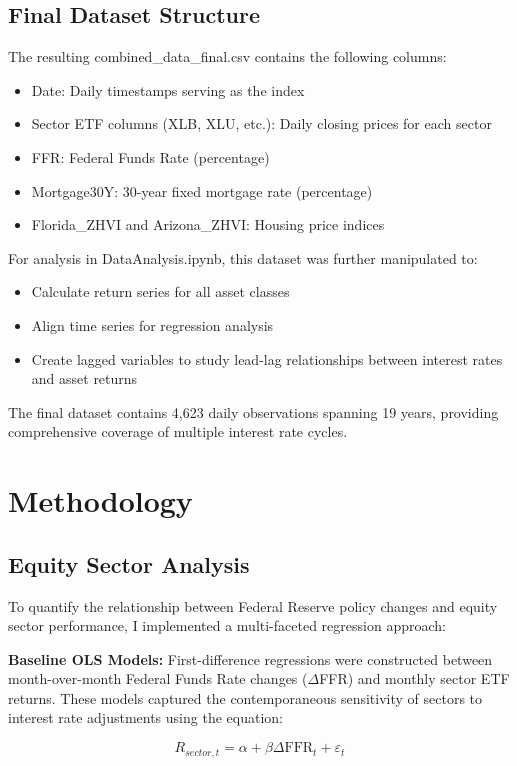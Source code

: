 \documentclass[12pt, stu, abstract]{apa7}
\begin{document}
\subsection{Final Dataset Structure}
The resulting combined\_data\_final.csv contains the following columns:

\begin{itemize}
\item Date: Daily timestamps serving as the index
\item Sector ETF columns (XLB, XLU, etc.): Daily closing prices for each sector
\item FFR: Federal Funds Rate (percentage)
\item Mortgage30Y: 30-year fixed mortgage rate (percentage)
\item Florida\_ZHVI and Arizona\_ZHVI: Housing price indices
\end{itemize}

For analysis in DataAnalysis.ipynb, this dataset was further manipulated to:
\begin{itemize}
\item Calculate return series for all asset classes
\item Align time series for regression analysis
\item Create lagged variables to study lead-lag relationships between interest rates and asset returns
\end{itemize}

The final dataset contains 4,623 daily observations spanning 19 years, providing comprehensive coverage of multiple interest rate cycles.

\section{Methodology}
\subsection{Equity Sector Analysis}
To quantify the relationship between Federal Reserve policy changes and equity sector performance, I implemented a multi-faceted regression approach:

\textbf{Baseline OLS Models:} First-difference regressions were constructed between month-over-month Federal Funds Rate changes ($\Delta$FFR) and monthly sector ETF returns. These models captured the contemporaneous sensitivity of sectors to interest rate adjustments using the equation:

\begin{equation}
R_{sector,t} = \alpha + \beta \Delta \text{FFR}_t + \varepsilon_t
\end{equation}
\end{document}
